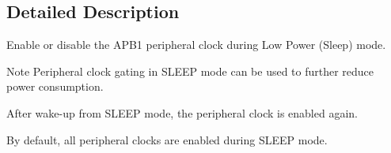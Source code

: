 \subsection{Detailed Description}
Enable or disable the A\+P\+B1 peripheral clock during Low Power (Sleep) mode. 

\begin{DoxyNote}{Note}
Peripheral clock gating in S\+L\+E\+EP mode can be used to further reduce power consumption. 

After wake-\/up from S\+L\+E\+EP mode, the peripheral clock is enabled again. 

By default, all peripheral clocks are enabled during S\+L\+E\+EP mode. 
\end{DoxyNote}
